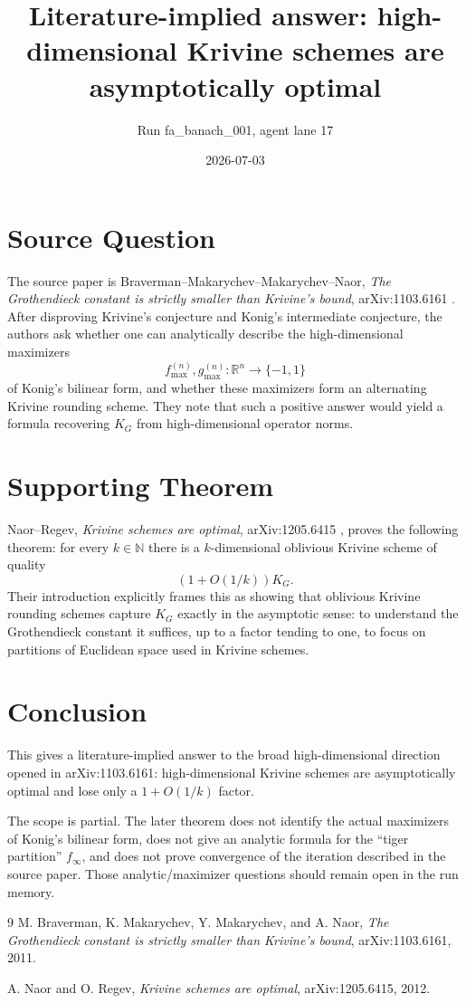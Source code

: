 \documentclass[11pt]{article}
\title{Literature-implied answer: high-dimensional Krivine schemes are asymptotically optimal}
\author{Run fa\_banach\_001, agent lane 17}
\date{2026-07-03}
\begin{document}
\maketitle
\sloppy

\section*{Source Question}

The source paper is Braverman--Makarychev--Makarychev--Naor,
\emph{The Grothendieck constant is strictly smaller than Krivine's bound},
arXiv:1103.6161 \cite{BMMN2011}. After disproving Krivine's conjecture and
Konig's intermediate conjecture, the authors ask whether one can analytically
describe the high-dimensional maximizers
\[
 f_{\max}^{(n)},g_{\max}^{(n)}:\mathbb R^n\to\{-1,1\}
\]
of Konig's bilinear form, and whether these maximizers form an alternating
Krivine rounding scheme. They note that such a positive answer would yield a
formula recovering \(K_G\) from high-dimensional operator norms.

\section*{Supporting Theorem}

Naor--Regev, \emph{Krivine schemes are optimal}, arXiv:1205.6415
\cite{NR2012}, proves the following theorem: for every \(k\in\mathbb N\)
there is a \(k\)-dimensional oblivious Krivine scheme of quality
\[
 (1+O(1/k))K_G .
\]
Their introduction explicitly frames this as showing that oblivious Krivine
rounding schemes capture \(K_G\) exactly in the asymptotic sense: to understand
the Grothendieck constant it suffices, up to a factor tending to one, to focus
on partitions of Euclidean space used in Krivine schemes.

\section*{Conclusion}

This gives a literature-implied answer to the broad high-dimensional direction
opened in arXiv:1103.6161: high-dimensional Krivine schemes are asymptotically
optimal and lose only a \(1+O(1/k)\) factor.

The scope is partial. The later theorem does not identify the actual
maximizers of Konig's bilinear form, does not give an analytic formula for the
``tiger partition'' \(f_\infty\), and does not prove convergence of the
iteration described in the source paper. Those analytic/maximizer questions
should remain open in the run memory.

\begin{thebibliography}{9}
M. Braverman, K. Makarychev, Y. Makarychev, and A. Naor,
\emph{The Grothendieck constant is strictly smaller than Krivine's bound},
arXiv:1103.6161, 2011.

A. Naor and O. Regev,
\emph{Krivine schemes are optimal}, arXiv:1205.6415, 2012.
\end{thebibliography}
\end{document}
